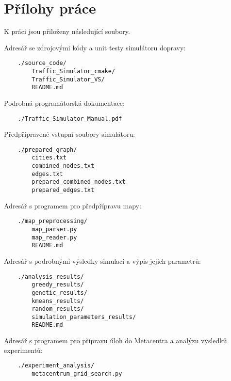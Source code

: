 \chapter{Přílohy práce}
\label{chap:prilohy}

K práci jsou přiloženy následující soubory.

Adresář se zdrojovými kódy a unit testy simulátoru dopravy:

\begin{verbatim}
    ./source_code/
        Traffic_Simulator_cmake/
        Traffic_Simulator_VS/
        README.md   
\end{verbatim}

Podrobná programátorská dokumentace:

\begin{verbatim}
    ./Traffic_Simulator_Manual.pdf
\end{verbatim}

Předpřipravené vstupní soubory simulátoru:

\begin{verbatim}
    ./prepared_graph/
        cities.txt
        combined_nodes.txt
        edges.txt
        prepared_combined_nodes.txt
        prepared_edges.txt
\end{verbatim}

Adresář s programem pro předpřípravu mapy:

\begin{verbatim}
    ./map_preprocessing/
        map_parser.py
        map_reader.py
        README.md
\end{verbatim}

Adresář s podrobnými výsledky simulací a výpis jejich parametrů:
\begin{verbatim}
    ./analysis_results/
        greedy_results/
        genetic_results/
        kmeans_results/
        random_results/
        simulation_parameters_results/
        README.md
\end{verbatim}

Adresář s programem pro přípravu úloh do Metacentra a analýzu výsledků experimentů:
\begin{verbatim}
    ./experiment_analysis/
        metacentrum_grid_search.py
\end{verbatim}
